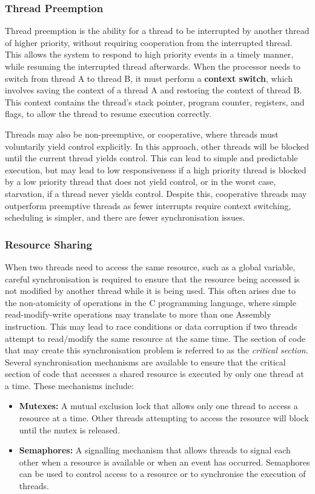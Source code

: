 \documentclass{article}
\begin{document}
\subsubsection{Thread Preemption}
Thread preemption is the ability for a thread to be interrupted by
another thread of higher priority, without requiring cooperation from
the interrupted thread. This allows the system to respond to high
priority events in a timely manner, while resuming the interrupted
thread afterwards. When the processor needs to switch from thread A to
thread B, it must perform a \textbf{context switch}, which involves
saving the context of a thread A and restoring the context of thread B.
This context contains the thread's stack pointer, program counter,
registers, and flags, to allow the thread to resume execution
correctly.

Threads may also be non-preemptive, or cooperative, where threads must
voluntarily yield control explicitly. In this approach, other threads
will be blocked until the current thread yields control. This can lead
to simple and predictable execution, but may lead to low responsiveness
if a high priority thread is blocked by a low priority thread that does
not yield control, or in the worst case, starvation, if a thread never
yields control. Despite this, cooperative threads may outperform
preemptive threads as fewer interrupts require context switching,
scheduling is simpler, and there are fewer synchronisation issues.
\subsubsection{Resource Sharing}
When two threads need to access the same resource, such as a global
variable, careful synchronisation is required to ensure that the
resource being accessed is not modified by another thread while it is
being used. This often arises due to the non-atomicity of operations in
the C programming language, where simple read-modify-write operations
may translate to more than one Assembly instruction. This may lead to
race conditions or data corruption if two threads attempt to
read/modify the same resource at the same time. The section of code
that may create this synchronisation problem is referred to as the
\textit{critical section}. Several synchronisation mechanisms are
available to ensure that the critical section of code that accesses a
shared resource is executed by only one thread at a time. These
mechanisms include:
\begin{itemize}
    \item \textbf{Mutexes:} A mutual exclusion lock that
          allows only one thread to access a resource at a time. Other
          threads attempting to access the resource will block until the
          mutex is released.
    \item \textbf{Semaphores:} A signalling mechanism that allows
          threads to signal each other when a resource is available or
          when an event has occurred. Semaphores can be used to control
          access to a resource or to synchronise the execution of
          threads.
\end{itemize}
\end{document}
